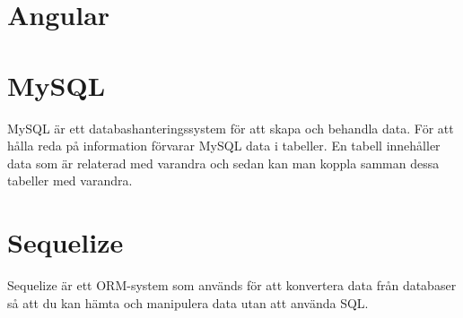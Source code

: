 \section{Angular}

\section{MySQL}
MySQL är ett databashanteringssystem för att skapa och behandla data. För att hålla reda på information förvarar MySQL data i tabeller. En tabell innehåller data som är relaterad med varandra och sedan kan man koppla samman dessa tabeller med varandra.
\cite{mysql}

\section{Sequelize}
Sequelize är ett ORM-system som används för att konvertera data från databaser så att du kan hämta och manipulera data utan att använda SQL.
\cite{sequelize}
